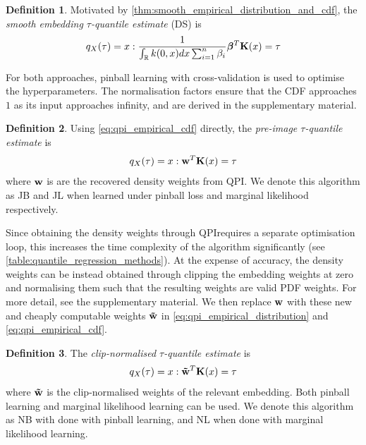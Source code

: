 \documentclass[twoside]{article} \usepackage{aistats2017}
\theoremstyle{definition}
\newtheorem{definition}{Definition}[section]
\theoremstyle{theorem}
\newcommand{\rv}[1]{{#1}}
\newcommand{\qpi}{QPI}
\begin{document}
	\theoremstyle{definition}
	\begin{definition}
		Motivated by \cref{thm:smooth_empirical_distribution_and_cdf}, the \textit{smooth embedding $\tau$-quantile estimate} (DS) is
		\begin{equation}
		q_{\rv{X}}(\tau) = x : \frac{1}{\int_{\mathbb{R}} k(0, x) dx \sum_{i = 1}^{n} \beta_{i}} \bm{\beta}^{T} \bvec{K}(x) = \tau
		\end{equation}	
	\end{definition}
	
	For both approaches, pinball learning with cross-validation is used to optimise the hyperparameters. The normalisation factors ensure that the CDF approaches $1$ as its input approaches infinity, and are derived in the supplementary material.

	\theoremstyle{definition}
	\begin{definition}
		Using \eqref{eq:qpi_empirical_cdf} directly, the \textit{pre-image $\tau$-quantile estimate} is
		\begin{equation}
			q_{\rv{X}}(\tau) = x : \bvec{w}^{T} \bvec{K}(x) = \tau
		\end{equation}	
		where $\mathbf{w}$ is are the recovered density weights from QPI.
		We denote this algorithm as JB and JL when learned under pinball loss and marginal likelihood respectively.
	\end{definition}
	
	Since obtaining the density weights through \qpi\space requires a separate optimisation loop, this increases the time complexity of the algorithm significantly (see \cref{table:quantile_regression_methods}). At the expense of accuracy, the density weights can be instead obtained through clipping the embedding weights at zero and normalising them such that the resulting weights are valid PDF weights. For more detail, see the supplementary material. We then replace $\mathbf{w}$ with these new and cheaply computable weights $\mathbf{\tilde{w}}$ in \eqref{eq:qpi_empirical_distribution} and \eqref{eq:qpi_empirical_cdf}.
%
%

	\theoremstyle{definition}
	\begin{definition}
		The \textit{clip-normalised $\tau$-quantile estimate} is
		\begin{equation}
		q_{\rv{X}}(\tau) = x : \bvec{\tilde{w}}^{T} \bvec{K}(x) = \tau
		\end{equation}
		where $\mathbf{\tilde{w}}$ is the clip-normalised weights of the relevant embedding.
		Both pinball learning and marginal likelihood learning can be used. We denote this algorithm as NB with done with pinball learning, and NL when done with marginal likelihood learning.
	\end{definition}	
	
\end{document}
